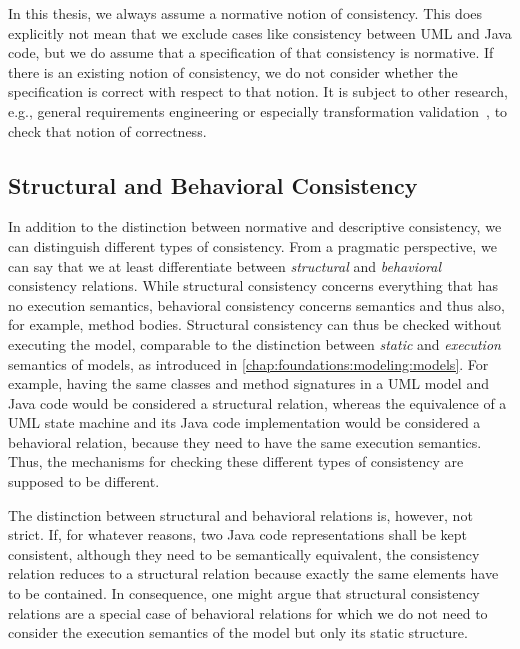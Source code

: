 In this thesis, we always assume a normative notion of consistency.
This does explicitly not mean that we exclude cases like consistency between \gls{UML} and Java code, but we do assume that a specification of that consistency is normative.
If there is an existing notion of consistency, we do not consider whether the specification is correct with respect to that notion.
It is subject to other research, e.g., general requirements engineering or especially transformation validation~\cite{add}, to check that notion of correctness.



\subsection{Structural and Behavioral Consistency}
\label{chap:networks:notionsandprocesses:types}

In addition to the distinction between normative and descriptive consistency, we can distinguish different types of consistency.
From a pragmatic perspective, we can say that we at least differentiate between \emph{structural} and \emph{behavioral} consistency relations.
While structural consistency concerns everything that has no execution semantics, behavioral consistency concerns semantics and thus also, for example, method bodies.
Structural consistency can thus be checked without executing the model, comparable to the distinction between \emph{static} and \emph{execution} semantics of models, as introduced in \autoref{chap:foundations:modeling:models}.
For example, having the same classes and method signatures in a \gls{UML} model and Java code would be considered a structural relation, whereas the equivalence of a \gls{UML} state machine and its Java code implementation would be considered a behavioral relation, because they need to have the same execution semantics.
Thus, the mechanisms for checking these different types of consistency are supposed to be different.

The distinction between structural and behavioral relations is, however, not strict.
If, for whatever reasons, two Java code representations shall be kept consistent, although they need to be semantically equivalent, the consistency relation reduces to a structural relation because exactly the same elements have to be contained.
In consequence, one might argue that structural consistency relations are a special case of behavioral relations for which we do not need to consider the execution semantics of the model but only its static structure.

